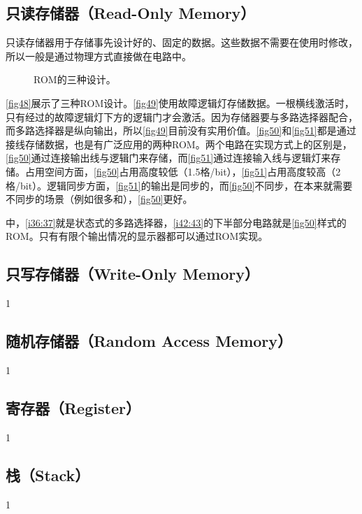 \subsection{只读存储器（Read-Only Memory）}
只读存储器用于存储事先设计好的、固定的数据。这些数据不需要在使用时修改，所以一般是通过物理方式直接做在电路中。
\begin{figure}[!ht]
    \centering
	
    \caption{ROM的三种设计。}\label{fig48}
\end{figure}
\autoref{fig48}展示了三种ROM设计。\autoref{fig49}使用故障逻辑灯存储数据。一根横线激活时，只有经过的故障逻辑灯下方的逻辑门才会激活。因为存储器要与多路选择器配合，而多路选择器是纵向输出，所以\autoref{fig49}目前没有实用价值。\autoref{fig50}和\autoref{fig51}都是通过接线存储数据，也是有广泛应用的两种ROM。两个电路在实现方式上的区别是，\autoref{fig50}通过连接输出线与逻辑门来存储，而\autoref{fig51}通过连接输入线与逻辑灯来存储。占用空间方面，\autoref{fig50}占用高度较低（1.5格/bit），\autoref{fig51}占用高度较高（2格/bit）。逻辑同步方面，\autoref{fig51}的输出是同步的，而\autoref{fig50}不同步，在本来就需要不同步的场景（例如很多和），\autoref{fig50}更好。

中，\autoref{i36:37}就是状态式的多路选择器，\autoref{i42:43}的下半部分电路就是\autoref{fig50}样式的ROM。只有有限个输出情况的显示器都可以通过ROM实现。

\subsection{只写存储器（Write-Only Memory）}
1
\subsection{随机存储器（Random Access Memory）}
1
\subsection{寄存器（Register）}
1
\subsection{栈（Stack）}
1